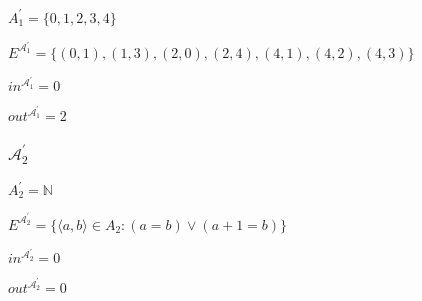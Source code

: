 $A_1^\prime = \{0,1,2,3,4\}$

$E^{\mathcal{A}_1^\prime} = \{(0,1),(1,3),(2,0),(2,4),(4,1),(4,2),(4,3)\}$

$in^{\mathcal{A}_1^\prime} = 0$

$out^{\mathcal{A}_1^\prime} = 2$

\subsubsection*{$\mathcal{A}_2^\prime$}

$A_2^\prime = \mathbb{N}$

$E^{\mathcal{A}_2^\prime} = \{\langle a,b\rangle \in A_2 : (a = b) \vee (a + 1 = b)\} $

$in^{\mathcal{A}_2^\prime} = 0$

$out^{\mathcal{A}_2^\prime} = 0$